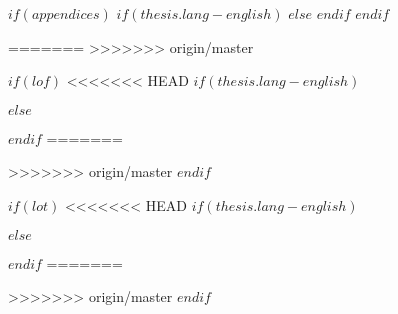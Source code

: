 $if(appendices)$
$if(thesis.lang-english)$
$else$
\renewcommand{\appendixname}{Anhang}
\renewcommand{\appendixpagename}{Anhang}
\renewcommand{\appendixtocname}{Anhang}
$endif$
$endif$

=======
>>>>>>> origin/master

$if(lof)$
<<<<<<< HEAD
$if(thesis.lang-english)$
    \listoffigures
$else$
    \renewcommand*\listfigurename{Abbildungsverzeichnis}
    \listoffigures
$endif$
=======
    \listoffigures
>>>>>>> origin/master
$endif$




$if(lot)$
<<<<<<< HEAD
$if(thesis.lang-english)$
    \listoftables
$else$
    \renewcommand*\listtablename{Tabellenverzeichnis}
    \listoftables
$endif$
=======
    \listoftables
>>>>>>> origin/master
$endif$

